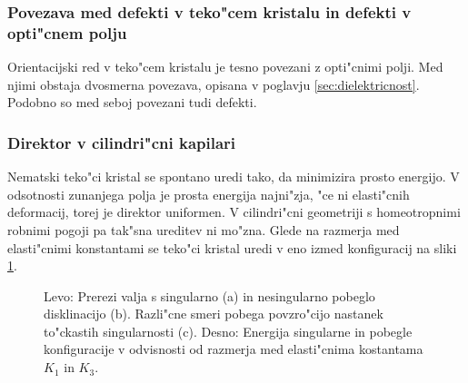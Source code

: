 \documentclass[a4paper,10pt]{article}
\begin{document}
\subsubsection{Povezava med defekti v teko"cem kristalu in defekti v opti"cnem polju}
Orientacijski red v teko"cem kristalu je tesno povezani z opti"cnimi polji. 
Med njimi obstaja dvosmerna povezava, opisana v poglavju \ref{sec:dielektricnost}. 
Podobno so med seboj povezani tudi defekti. 


\subsubsection{Direktor v cilindri"cni kapilari}

Nematski teko"ci kristal se spontano uredi tako, da minimizira prosto energijo. 
V odsotnosti zunanjega polja je prosta energija najni"zja, "ce ni elasti"cnih deformacij, torej je direktor uniformen. 
V cilindri"cni geometriji s homeotropnimi robnimi pogoji pa tak"sna ureditev ni mo"zna. 
Glede na razmerja med elasti"cnimi konstantami se teko"ci kristal uredi v eno izmed konfiguracij na sliki \ref{fig:director-profiles}. 

\begin{figure}[h]
\centering
{}
\caption{Levo: Prerezi valja s singularno (a) in nesingularno pobeglo disklinacijo (b). 
Razli"cne smeri pobega povzro"cijo nastanek to"ckastih singularnosti (c). Desno: Energija singularne in pobegle konfiguracije v odvisnosti od razmerja med elasti"cnima kostantama $K_1$ in $K_3$\cite{kleman}. }
 \label{fig:director-profiles}
\end{figure}
\end{document}
